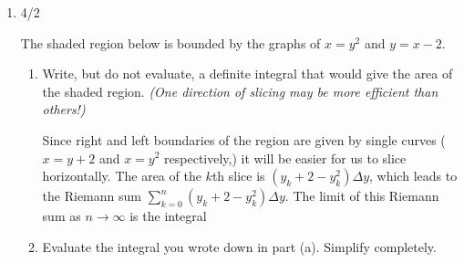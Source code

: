 \documentclass{article}
\begin{document}
\begin{enumerate}
\pspace{\newpage}
 
\item 

\begin{grading}
    4/2
\end{grading}

\begin{problem}
The shaded region below is bounded by the graphs of
$x=y^2$ and $y=x-2$. 
\end{problem}

\begin{center}

\end{center}

\begin{enumerate}
    \item 
    \begin{problem}
    Write, but do not evaluate, a definite integral that would give the area
    of the shaded region. \textit{(One direction of slicing may be more efficient than others!)}
    \end{problem}
    \pspace{\vfill}

    \begin{solution}
        Since right and left boundaries of the region are given by single curves ($x=y+2$ and $x=y^2$ respectively,) it will be easier for us to slice horizontally. The area of the $k$th slice is $(y_k+2 -y_k^2)\Delta y$, which leads to the Riemann sum $\displaystyle \sum_{k=0}^n (y_k+2 -y_k^2)\Delta y$. The limit of this Riemann sum as $n \to \infty$ is the integral 
    \end{solution}
    
    \item 
    \begin{problem}
    Evaluate the integral you wrote down in part (a). Simplify completely.
    \end{problem}
    \pspace{\vfill}


\end{enumerate}
\end{enumerate}
\end{document}
